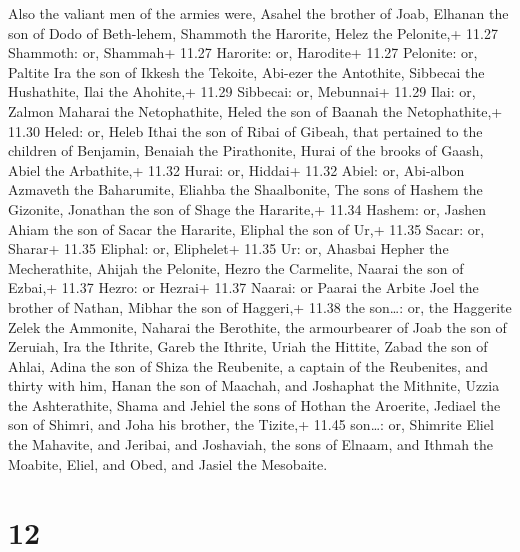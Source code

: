  Also the valiant men of the armies were, Asahel the
brother of Joab, Elhanan the son of Dodo of Beth-lehem, 
Shammoth the Harorite, Helez the Pelonite,+ 11.27 Shammoth: or, Shammah+
11.27 Harorite: or, Harodite+ 11.27 Pelonite: or, Paltite 
Ira the son of Ikkesh the Tekoite, Abi-ezer the Antothite, 
Sibbecai the Hushathite, Ilai the Ahohite,+ 11.29 Sibbecai: or,
Mebunnai+ 11.29 Ilai: or, Zalmon  Maharai the Netophathite,
Heled the son of Baanah the Netophathite,+ 11.30 Heled: or, Heleb
 Ithai the son of Ribai of Gibeah, that pertained to the
children of Benjamin, Benaiah the Pirathonite,  Hurai of
the brooks of Gaash, Abiel the Arbathite,+ 11.32 Hurai: or, Hiddai+
11.32 Abiel: or, Abi-albon  Azmaveth the Baharumite,
Eliahba the Shaalbonite,  The sons of Hashem the Gizonite,
Jonathan the son of Shage the Hararite,+ 11.34 Hashem: or, Jashen
 Ahiam the son of Sacar the Hararite, Eliphal the son of
Ur,+ 11.35 Sacar: or, Sharar+ 11.35 Eliphal: or, Eliphelet+ 11.35 Ur:
or, Ahasbai  Hepher the Mecherathite, Ahijah the Pelonite,
 Hezro the Carmelite, Naarai the son of Ezbai,+ 11.37
Hezro: or Hezrai+ 11.37 Naarai: or Paarai the Arbite  Joel
the brother of Nathan, Mibhar the son of Haggeri,+ 11.38 the son\ldots:
or, the Haggerite  Zelek the Ammonite, Naharai the
Berothite, the armourbearer of Joab the son of Zeruiah, 
Ira the Ithrite, Gareb the Ithrite,  Uriah the Hittite,
Zabad the son of Ahlai,  Adina the son of Shiza the
Reubenite, a captain of the Reubenites, and thirty with him,
 Hanan the son of Maachah, and Joshaphat the Mithnite,
 Uzzia the Ashterathite, Shama and Jehiel the sons of
Hothan the Aroerite,  Jediael the son of Shimri, and Joha
his brother, the Tizite,+ 11.45 son\ldots: or, Shimrite 
Eliel the Mahavite, and Jeribai, and Joshaviah, the sons of Elnaam, and
Ithmah the Moabite,  Eliel, and Obed, and Jasiel the
Mesobaite.

\hypertarget{section-11}{%
\section{12}\label{section-11}}

